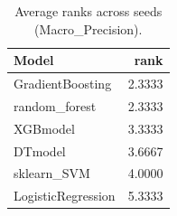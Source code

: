 \begin{table}[t]
\centering
\begin{tabular}{lr}
\toprule
Model & rank \\
\midrule
GradientBoosting & 2.3333 \\
random_forest & 2.3333 \\
XGBmodel & 3.3333 \\
DTmodel & 3.6667 \\
sklearn_SVM & 4.0000 \\
LogisticRegression & 5.3333 \\
\bottomrule
\end{tabular}
\caption{Average ranks across seeds (Macro_Precision).}
\label{tab:avg_rank_Macro_Precision}
\end{table}